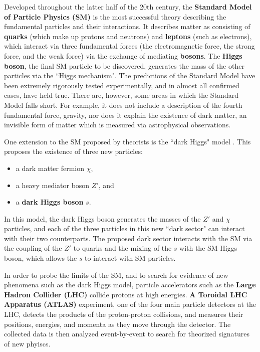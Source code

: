 \label{chapter:introduction}

Developed throughout the latter half of the 20th century, the \textbf{Standard Model of Particle Physics (SM)} \cite{peskin,schwartz,pdg_rev,Griffiths} is the most successful theory describing the fundamental particles and their interactions. It describes matter as consisting of \textbf{quarks} (which make up protons and neutrons) and \textbf{leptons} (such as electrons), which interact via three fundamental forces (the electromagnetic force, the strong force, and the weak force) via the exchange of mediating \textbf{bosons}. The \textbf{Higgs boson}, the final SM particle to be discovered, generates the mass of the other particles via the ``Higgs mechanism".  The predictions of the Standard Model have been extremely rigorously tested experimentally, and in almost all confirmed cases, have held true. There are, however, some areas in which the Standard Model falls short. For example, it does not include a description of the fourth fundamental force, gravity, nor does it explain the existence of dark matter, an invisible form of matter which is measured via astrophysical observations.

One extension to the SM proposed by theorists is the ``dark Higgs" model \cite{Hunting}. This proposes the existence of three new particles:
\begin{itemize}
\item a dark matter fermion $\chi$,
\item a heavy mediator boson $Z'$, and
\item a \textbf{dark Higgs boson} $s$.
\end{itemize}
In this model, the dark Higgs boson generates the masses of the $Z'$ and $\chi$ particles, and each of the three particles in this new ``dark sector" can interact with their two counterparts. The proposed dark sector interacts with the SM via the coupling of the $Z'$ to quarks and the mixing of the $s$ with the SM Higgs boson, which allows the $s$ to interact with SM particles.

In order to probe the limits of the SM, and to search for evidence of new phenomena such as the dark Higgs model, particle accelerators such as the \textbf{Large Hadron Collider (LHC)} collide protons at high energies. \textbf{A Toroidal LHC Apparatus (ATLAS)} experiment, one of the four main particle detectors at the LHC, detects the products of the proton-proton collisions, and measures their positions, energies, and momenta as they move through the detector. The collected data is then analyzed event-by-event to search for theorized signatures of new phyiscs.


